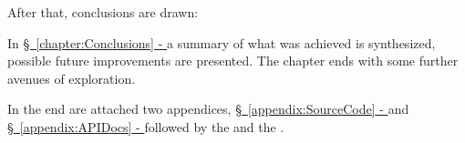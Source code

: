 After that, conclusions are drawn:

In \hyperref[chapter:Conclusions]{\S\ \ref{chapter:Conclusions} - } a summary of what was achieved is synthesized, possible future improvements are presented.
The chapter ends with some further avenues of exploration.
\medskip

In the end are attached two appendices, \hyperref[appendix:SourceCode]{\S\ \ref{appendix:SourceCode} - } and \hyperref[appendix:APIDocs]{\S\ \ref{appendix:APIDocs} - } followed by the \hyperref[Backmatter:Glossary]{} and the \hyperref[Backmatter:Bibliography]{}.

\newpage
\thispagestyle{empty}
